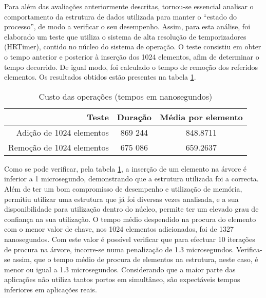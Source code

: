 Para além das avaliações anteriormente descritas, tornou-se essencial analisar o comportamento da estrutura de dados utilizada para manter o “estado do processo”, de modo a verificar o seu desempenho.
Assim, para esta análise, foi elaborado um teste que utiliza o sistema de alta resolução de temporizadores (HRTimer), contido no núcleo do sistema de operação. O teste consistiu em obter o tempo anterior e posterior à inserção dos 1024 elementos, afim de determinar o tempo decorrido.
De igual modo, foi calculado o tempo de remoção dos referidos elementos. Os resultados obtidos estão presentes na tabela \ref{tab:tree_info}.

\begin{table}[!htb]
\begin{center}
\caption{Custo das operações (tempos em nanosegundos)}
\begin{tabular}{ | r | c | c | }
\hline
\hspace{1cm} Teste \hspace{1.5cm} & \hspace{1cm}Duração\hspace{1cm} &  Média por
elemento \\
\hline
Adição de 1024 elementos & 869 244 & 848.8711 \\
\hline
Remoção de 1024 elementos & 675 086 & 659.2637\\
\hline

\hline
\end{tabular}
\label{tab:tree_info}
\end{center}
\end{table}

Como se pode verificar, pela tabela \ref{tab:tree_info}, a inserção de um elemento na árvore é inferior a 1 microsegundo, demonstrando que a estrutura utilizada foi a correcta.
Além de ter um bom compromisso de desempenho e utilização de memória, permitiu utilizar uma estrutura que já foi diversas vezes analisada, e a sua disponibilidade para utilização dentro do núcleo, permite ter um elevado grau de confiança na sua utilização.
O tempo médio despendido na procura do elemento com o menor valor de chave, nos 1024 elementos adicionados, foi de 1327 nanosegundos.
Com este valor é possível verificar que para efectuar 10 iterações de procura na árvore, incorre-se numa penalização de 1.3 microsegundos.
Verifica-se assim, que o tempo médio de procura de elementos na estrutura, neste caso, é menor ou igual a 1.3 microsegundos.
Considerando que a maior parte das aplicações não utiliza tantos portos em simultâneo, são expectáveis tempos inferiores em aplicações reais.
